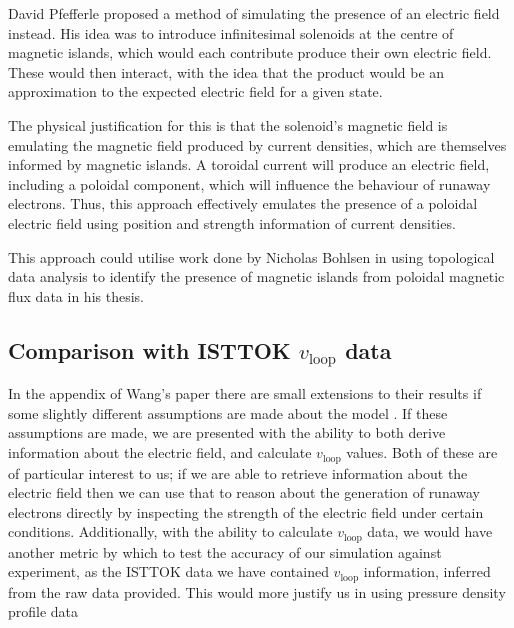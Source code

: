 David Pfefferle proposed a method of simulating the presence of 
an electric field instead. His idea was to introduce infinitesimal 
solenoids at the centre of magnetic islands, which would each contribute 
produce their own electric field. These would then interact, with the idea 
that the product would be an approximation to the expected 
electric field for a given state. 

The physical justification for this is that the solenoid's magnetic field is 
emulating the magnetic field produced by current densities, which 
are themselves informed by magnetic islands. A toroidal current 
will produce an electric field, including a poloidal component, which 
will influence the behaviour of runaway electrons. Thus, this approach 
effectively emulates the presence of a poloidal electric field using 
position and strength information of current densities.

This approach could utilise work done by Nicholas Bohlsen in using topological 
data analysis to identify the presence of magnetic islands from poloidal magnetic flux data in his thesis.

\subsection{Comparison with ISTTOK $v_{\text{loop}}$ data}
In the appendix of Wang's paper there are small extensions to their results if 
some slightly different assumptions are made about the model \cite{wang-analytic-solution}. If these assumptions are made, we are presented with the 
ability to both derive information about the electric field, and calculate $v_{\text{loop}}$ values. Both of these
are of particular interest to us; if we are able to retrieve information about the electric field then we can use that to reason 
about the generation of runaway electrons directly by inspecting the strength of the electric field under certain conditions. 
Additionally, with the ability to calculate $v_{\text{loop}}$ data, we would have another metric by which to test the accuracy 
of our simulation against experiment, as the ISTTOK data we have contained $v_{\text{loop}}$ information, inferred from the 
raw data provided. This would more justify us in using pressure density profile data

